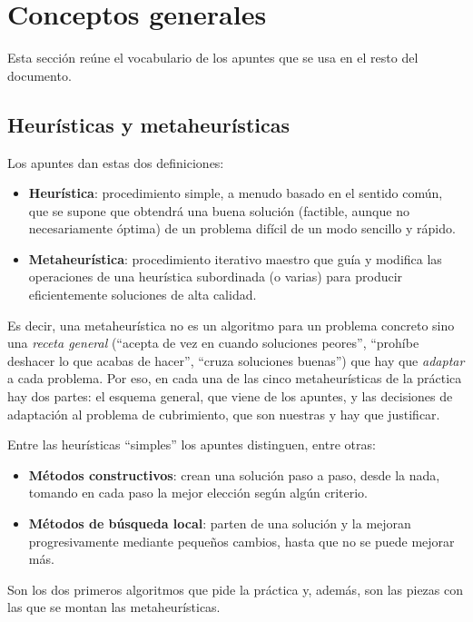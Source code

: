 \section{Conceptos generales}\label{sec:conceptos}

Esta sección reúne el vocabulario de los apuntes que se usa en el resto del documento.

\subsection{Heurísticas y metaheurísticas}

Los apuntes dan estas dos definiciones:
\begin{itemize}
  \item \textbf{Heurística}: procedimiento simple, a menudo basado en el sentido común, que
        se supone que obtendrá una buena solución (factible, aunque no necesariamente
        óptima) de un problema difícil de un modo sencillo y rápido.
  \item \textbf{Metaheurística}: procedimiento iterativo maestro que guía y modifica las
        operaciones de una heurística subordinada (o varias) para producir eficientemente
        soluciones de alta calidad.
\end{itemize}
Es decir, una metaheurística no es un algoritmo para un problema concreto sino una
\emph{receta general} (``acepta de vez en cuando soluciones peores'', ``prohíbe deshacer lo
que acabas de hacer'', ``cruza soluciones buenas'') que hay que \emph{adaptar} a cada
problema. Por eso, en cada una de las cinco metaheurísticas de la práctica hay dos partes:
el esquema general, que viene de los apuntes, y las decisiones de adaptación al problema de
cubrimiento, que son nuestras y hay que justificar.

Entre las heurísticas ``simples'' los apuntes distinguen, entre otras:
\begin{itemize}
  \item \textbf{Métodos constructivos}: crean una solución paso a paso, desde la nada,
        tomando en cada paso la mejor elección según algún criterio.
  \item \textbf{Métodos de búsqueda local}: parten de una solución y la mejoran
        progresivamente mediante pequeños cambios, hasta que no se puede mejorar más.
\end{itemize}
Son los dos primeros algoritmos que pide la práctica y, además, son las piezas con las que
se montan las metaheurísticas.

